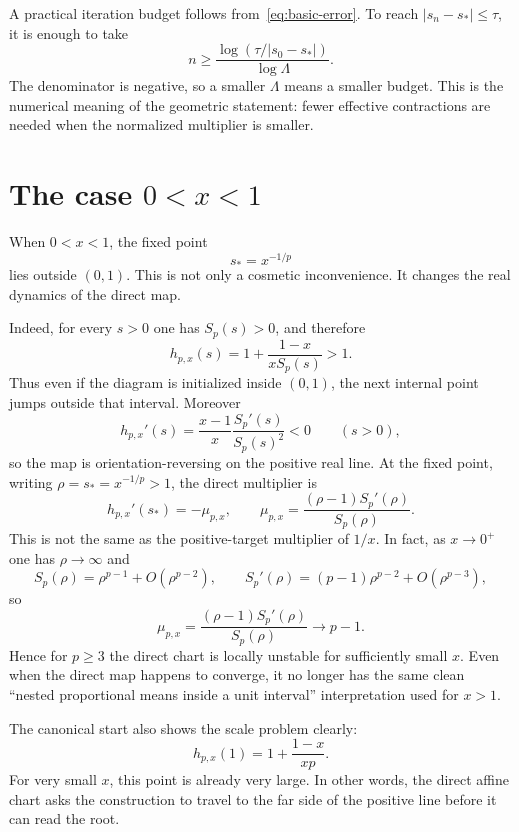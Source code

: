 \documentclass[10pt,a4paper]{article}
\theoremstyle{plain}
\theoremstyle{definition}
\theoremstyle{remark}
\begin{document}
A practical iteration budget follows from~\eqref{eq:basic-error}.  To reach
$|s_n-s_*|\le \tau$, it is enough to take
\begin{equation}
  n\ge
  \frac{\log(\tau/|s_0-s_*|)}{\log \Lambda}.
  \label{eq:budget}
\end{equation}
The denominator is negative, so a smaller $\Lambda$ means a smaller budget.
This is the numerical meaning of the geometric statement: fewer effective
contractions are needed when the normalized multiplier is smaller.

\section{The case \texorpdfstring{$0<x<1$}{0 < x < 1}}
\label{sec:x-less-one}

When $0<x<1$, the fixed point
\[
  s_*=x^{-1/p}
\]
lies outside $(0,1)$.  This is not only a cosmetic inconvenience.  It changes
the real dynamics of the direct map.

Indeed, for every $s>0$ one has $S_p(s)>0$, and therefore
\[
  h_{p,x}(s)
  =1+\frac{1-x}{xS_p(s)}>1.
\]
Thus even if the diagram is initialized inside $(0,1)$, the next internal point
jumps outside that interval.  Moreover
\[
  h_{p,x}'(s)=\frac{x-1}{x}\frac{S_p'(s)}{S_p(s)^2}<0
  \qquad(s>0),
\]
so the map is orientation-reversing on the positive real line.  At the fixed
point, writing $\rho=s_*=x^{-1/p}>1$, the direct multiplier is
\begin{equation}
  h_{p,x}'(s_*)
  =-\mu_{p,x},
  \qquad
  \mu_{p,x}
  =\frac{(\rho-1)S_p'(\rho)}{S_p(\rho)}.
  \label{eq:direct-small-x-multiplier}
\end{equation}
This is not the same as the positive-target multiplier of $1/x$.  In fact,
as $x\to0^+$ one has $\rho\to\infty$ and
\[
  S_p(\rho)=\rho^{p-1}+O(\rho^{p-2}),
  \qquad
  S_p'(\rho)=(p-1)\rho^{p-2}+O(\rho^{p-3}),
\]
so
\[
  \mu_{p,x}
  =\frac{(\rho-1)S_p'(\rho)}{S_p(\rho)}
  \longrightarrow p-1.
\]
Hence for $p\ge3$ the direct chart is locally unstable for sufficiently small
$x$.  Even when the direct map happens to converge, it no longer has the same
clean ``nested proportional means inside a unit interval'' interpretation used
for $x>1$.

The canonical start also shows the scale problem clearly:
\[
  h_{p,x}(1)=1+\frac{1-x}{xp}.
\]
For very small $x$, this point is already very large.  In other words, the
direct affine chart asks the construction to travel to the far side of the
positive line before it can read the root.
\end{document}
